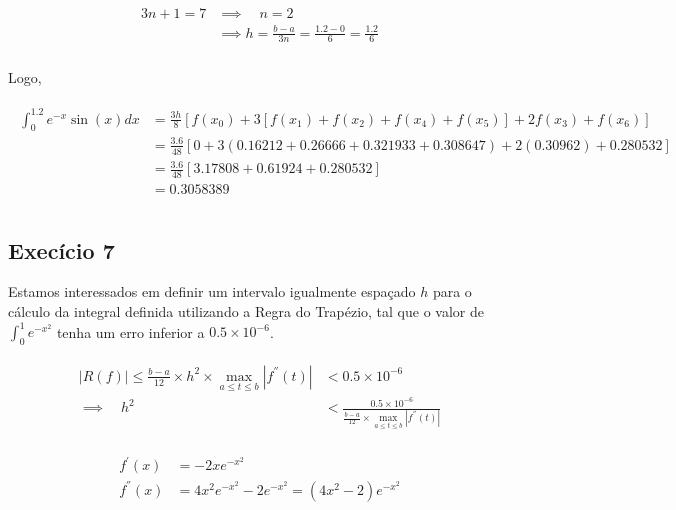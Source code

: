 \documentclass[paper=a4, fontsize=12pt]{scrartcl}
\numberwithin{equation}{section} %
\numberwithin{figure}{section} %
\numberwithin{table}{section} %
\newcommand{\euler}{e}
\begin{document}
		\begin{align*}
			\begin{split}
				3n + 1 = 7 	&\implies \quad n = 2 \\
				&\implies h = \frac{b - a}{3n} = \frac{1.2 - 0}{6} = \frac{1.2}{6}\\
			\end{split}
		\end{align*}

		Logo,

		\begin{align*}
			\begin{split}
				\int_{0}^{1.2} \euler^{-x}\sin(x)  dx &= \frac{3h}{8}[ f(x_0) + 3[f(x_1) + f(x_2) + f(x_4) + f(x_5)] + 2f(x_3) + f(x_6)] \\
				&= \frac{3.6}{48}\left[0 + 3(0.16212 + 0.26666 + 0.321933 + 0.308647) +  2(0.30962) +  0.280532\right] \\
				&= \frac{3.6}{48}\left[3.17808 + 0.61924 + 0.280532 \right]\\
				&=  0.3058389\\
			\end{split}
		\end{align*}

		\subsection{Execício 7}\label{ex07}

		Estamos interessados em definir um intervalo igualmente espaçado $h$ para o cálculo da integral definida utilizando a Regra do Trapézio, tal que o valor de $\int_{0}^{1} \euler^{-x^2}$ tenha um erro inferior a $0.5 \times 10^{-6}$.

		\begin{align*}
			\begin{split}
				| R(f) | \leq \frac{b - a}{12} \times h^2 \times \max_{a \leq t \leq b} |f^{''}(t)| & < 0.5 \times 10^{-6}\\ \implies \quad h^2  &< \frac{0.5 \times 10^{-6}}{\frac{b - a}{12} \times \max_{a \leq t \leq b} |f^{''}(t)|}
			\end{split}
		\end{align*}


		\begin{align*}
			\begin{split}
				f^{'} (x) &= -2x\euler^{-x^2} \\
				f^{''} (x) &= 4x^2\euler^{-x^2} - 2\euler^{-x^2} = (4x^2 -2)\euler^{-x^2}\\
			\end{split}
		\end{align*}
\end{document}
